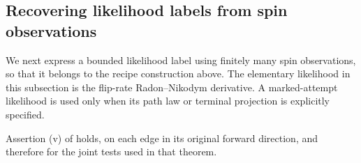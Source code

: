 \subsection{Recovering likelihood labels from spin observations}

We next express a bounded likelihood label using finitely many spin
observations, so that it belongs to the recipe construction above.
The elementary likelihood in this subsection is the flip-rate
Radon--Nikodym derivative.  A marked-attempt likelihood is used only
when its path law or terminal projection is explicitly specified.

\begin{lemma}
\label{lem:path-likelihood-approximation}
Assertion \textup{(v)} of  holds, on each edge
in its original forward direction, and therefore for the joint tests
used in that theorem.
\end{lemma}

